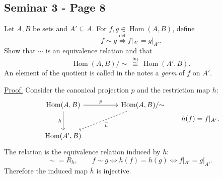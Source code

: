
\subsection*{Seminar 3 - Page 8}
\begingroup
\setlength{\abovedisplayskip}{5pt}
\setlength{\belowdisplayskip}{5pt}
\setlength{\abovedisplayshortskip}{3pt}
\setlength{\belowdisplayshortskip}{3pt}

Let $A,B$ be sets and $A'\subseteq A$. For
$f,g\in\operatorname{Hom}(A,B)$, define
\[
 f\sim g\overset{\mathrm{def}}\iff f|_{A'}=g|_{A'}.
\]
Show that $\sim$ is an equivalence relation and that
\[
 \operatorname{Hom}(A,B)/{\sim}
 \ \overset{\mathrm{bij}}{\cong}\ \operatorname{Hom}(A',B).
\]
An element of the quotient is called in the notes a \emph{germ}
of $f$ on $A'$.

\medskip
\noindent\underline{Proof.}
Consider the canonical projection $p$ and the restriction map $h$:
\[
\begin{tikzcd}[column sep=huge,row sep=large]
 \operatorname{Hom}(A,B)
    \arrow[r,"p"]\arrow[d,"h"']
  & \operatorname{Hom}(A,B)/{\sim}
       \arrow[dl,dashed,"\overline h"] \\
 \operatorname{Hom}(A',B) &
\end{tikzcd}
\qquad h(f)=f|_{A'}.
\]
The relation is the equivalence relation induced by $h$:
\[
 \sim\;=R_h,
 \qquad f\sim g\iff h(f)=h(g)
 \iff f|_{A'}=g|_{A'}.
\]
Therefore the induced map $\overline h$ is injective.

